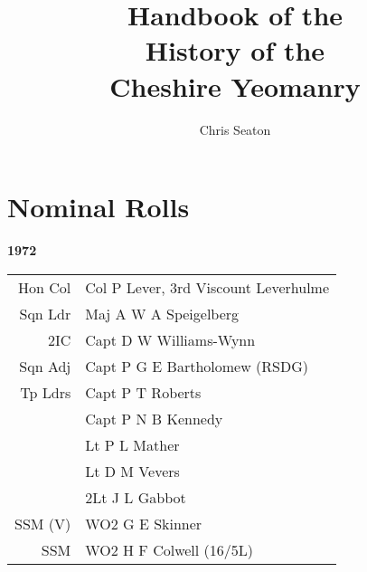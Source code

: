 \documentclass[a4paper,7pt]{book}
\title{Handbook of the \\ History of the \\ Cheshire Yeomanry}
\author{Chris Seaton}
\begin{document}
\maketitle

\part{Nominal Rolls}

\begin{center}
  {
    \Huge
    \textbf{1972}
  }
\end{center}

\begin{center}
  \small
  \begin{tabular}{rl}
    Hon Col & Col P Lever, 3rd Viscount Leverhulme \\
    Sqn Ldr & Maj A W A Speigelberg \\
    2IC & Capt D W Williams-Wynn \\
    Sqn Adj & Capt P G E Bartholomew (RSDG) \\
    Tp Ldrs & Capt P T Roberts \\
     & Capt P N B Kennedy \\
     & Lt P L Mather \\
     & Lt D M Vevers \\
     & 2Lt J L Gabbot \\
    SSM (V) & WO2 G E Skinner \\
    SSM & WO2 H F Colwell (16/5L) \\
  \end{tabular}
\end{center}
\end{document}
